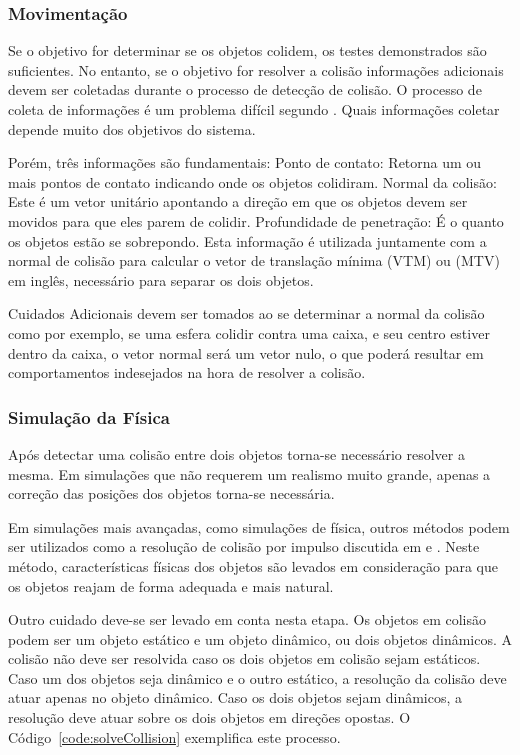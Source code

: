 \subsubsection{Movimentação}

Se o objetivo for determinar  se os objetos colidem, os testes demonstrados são
suficientes. No entanto, se o objetivo for resolver a colisão informações adicionais devem
ser coletadas durante o processo de detecção de colisão. O processo de coleta
de informações é um problema difícil segundo .
Quais informações coletar depende muito dos objetivos do sistema.

Porém, três informações são fundamentais:
Ponto de contato: Retorna um ou mais pontos de contato indicando onde os objetos colidiram.
Normal da colisão: Este é um vetor unitário apontando a direção em que os objetos devem ser movidos para que eles parem de colidir.
Profundidade de penetração: É o quanto os objetos estão se sobrepondo. Esta
informação é utilizada juntamente com a normal de colisão para calcular o vetor
de translação mínima (VTM) ou (MTV) em inglês, necessário para separar os dois
objetos.

Cuidados Adicionais devem ser tomados ao se determinar a normal da colisão como
por exemplo, se uma esfera colidir contra uma caixa, e seu centro estiver
dentro da caixa, o vetor normal será um vetor nulo, o que poderá resultar em
comportamentos indesejados na hora de resolver a colisão.

\subsubsection{Simulação da Física}

Após detectar uma colisão entre dois objetos torna-se necessário resolver
a mesma. Em simulações que não requerem um realismo muito grande, apenas a
correção das posições dos objetos torna-se necessária.

Em simulações mais avançadas, como simulações de física, outros métodos podem
ser utilizados como a resolução de colisão por impulso discutida em  e .
Neste método, características físicas dos objetos são levados em consideração
para que os objetos reajam de forma adequada e mais natural.

Outro cuidado deve-se ser levado em conta nesta etapa.
Os objetos em colisão podem ser um objeto estático e um objeto dinâmico, ou
dois objetos dinâmicos. A colisão não deve ser resolvida caso os dois objetos
em colisão sejam estáticos.
Caso um dos objetos seja dinâmico e o outro estático, a resolução da colisão
deve atuar apenas no objeto dinâmico.
Caso os dois objetos sejam dinâmicos, a resolução deve atuar sobre os dois
objetos em direções opostas. O Código~\ref{code:solveCollision} exemplifica este processo.

